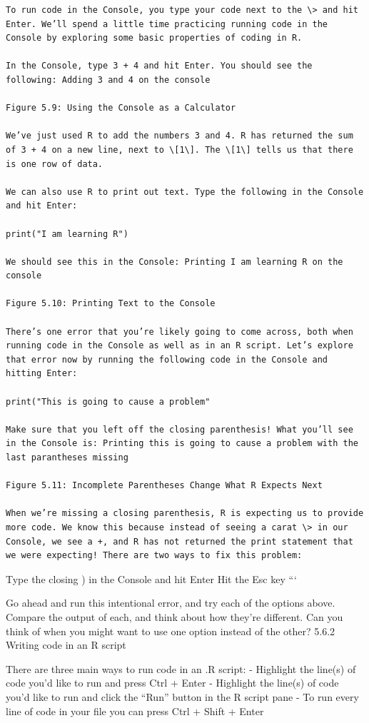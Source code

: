 \documentclass[
  letterpaper,
  DIV=11,
  numbers=noendperiod]{scrreprt}
\begin{document}
\begin{verbatim}
To run code in the Console, you type your code next to the \> and hit Enter. We’ll spend a little time practicing running code in the Console by exploring some basic properties of coding in R.

In the Console, type 3 + 4 and hit Enter. You should see the following: Adding 3 and 4 on the console

Figure 5.9: Using the Console as a Calculator

We’ve just used R to add the numbers 3 and 4. R has returned the sum of 3 + 4 on a new line, next to \[1\]. The \[1\] tells us that there is one row of data.

We can also use R to print out text. Type the following in the Console and hit Enter:

print("I am learning R")

We should see this in the Console: Printing I am learning R on the console

Figure 5.10: Printing Text to the Console

There’s one error that you’re likely going to come across, both when running code in the Console as well as in an R script. Let’s explore that error now by running the following code in the Console and hitting Enter:

print("This is going to cause a problem"

Make sure that you left off the closing parenthesis! What you’ll see in the Console is: Printing this is going to cause a problem with the last parantheses missing

Figure 5.11: Incomplete Parentheses Change What R Expects Next

When we’re missing a closing parenthesis, R is expecting us to provide more code. We know this because instead of seeing a carat \> in our Console, we see a +, and R has not returned the print statement that we were expecting! There are two ways to fix this problem:
\end{verbatim}

Type the closing ) in the Console and hit Enter Hit the Esc key ```

Go ahead and run this intentional error, and try each of the options
above. Compare the output of each, and think about how they're
different. Can you think of when you might want to use one option
instead of the other? 5.6.2 Writing code in an R script

There are three main ways to run code in an .R script: - Highlight the
line(s) of code you'd like to run and press Ctrl + Enter - Highlight the
line(s) of code you'd like to run and click the ``Run'' button in the R
script pane - To run every line of code in your file you can press Ctrl
+ Shift + Enter
\end{document}
